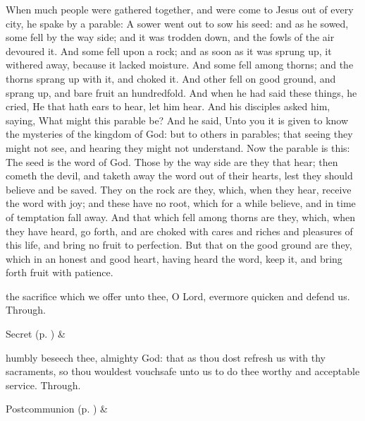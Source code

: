  When much people were gathered together, and were come to Jesus out of every city, he spake by a parable: A sower went out to sow his seed: and as he sowed, some fell by the way side; and it was trodden down, and the fowls of the air devoured it. And some fell upon a rock; and as soon as it was sprung up, it withered away, because it lacked moisture. And some fell among thorns; and the thorns sprang up with it, and choked it. And other fell on good ground, and sprang up, and bare fruit an hundredfold. And when he had said these things, he cried, He that hath ears to hear, let him hear. And his disciples asked him, saying, What might this parable be? And he said, Unto you it is given to know the mysteries of the kingdom of God: but to others in parables; that seeing they might not see, and hearing they might not understand. Now the parable is this: The seed is the word of God. Those by the way side are they that hear; then cometh the devil, and taketh away the word out of their hearts, lest they should believe and be saved. They on the rock are they, which, when they hear, receive the word with joy; and these have no root, which for a while believe, and in time of temptation fall away. And that which fell among thorns are they, which, when they have heard, go forth, and are choked with cares and riches and pleasures of this life, and bring no fruit to perfection. But that on the good ground are they, which in an honest and good heart, having heard the word, keep it, and bring forth fruit with patience.

\secret
{} the sacrifice which we offer unto thee, O Lord, evermore quicken and defend us. Through.


\begin{rubric}
     Secret  (p. \pageref{SPSaints}) \&  
\end{rubric}


\postcommunion
{} humbly beseech thee, almighty God: that as thou dost refresh us with thy sacraments, so thou wouldest vouchsafe unto us to do thee worthy and acceptable service. Through.
\begin{rubric}
     Postcommunion  (p. \pageref{SPSaints}) \&  
\end{rubric}


